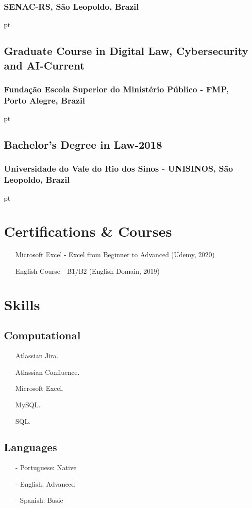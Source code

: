 \documentclass[11pt]{article}
\begin{document}
\subsubsection{SENAC-RS,  São Leopoldo, Brazil}
 pt%
\subsection{Graduate Course in Digital Law, Cybersecurity and AI\hfill {}-Current}  

\subsubsection{Fundação Escola Superior do Ministério Público - FMP,  Porto Alegre, Brazil}
 pt%
\subsection{Bachelor’s Degree in Law\hfill {}-2018}  

\subsubsection{Universidade do Vale do Rio dos Sinos - UNISINOS,  São Leopoldo, Brazil}
    
 pt%
\section{Certifications \& Courses}
\begin{itemize}
    \item[\checkmark] Microsoft Excel - Excel from Beginner to Advanced (Udemy, 2020)
    \item[\checkmark] English Course - B1/B2 (English Domain, 2019)
\end{itemize}
\section{Skills}
\subsection{Computational}
\begin{itemize}
    \item[\checkmark] Atlassian Jira.  
    \item[\checkmark] Atlassian Confluence. 
    \item[\checkmark] Microsoft Excel. 
    \item[\checkmark] MySQL.  
    \item[\checkmark] SQL.
\end{itemize}
\subsection{Languages}
\begin{itemize}
    \item[-] \textcolor{Sepia}{Portuguese}: Native
    \item[-] \textcolor{Sepia}{English}: Advanced
    \item[-] \textcolor{Sepia}{Spanish}: Basic
    \end{itemize}
\end{document}
